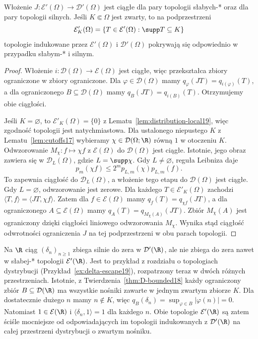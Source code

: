 \begin{twierdzenie}
\label{thm:dt-Eprime-fixed-support}
Włożenie $J:\mathcal E'(\Omega)\to\mathcal D'(\Omega)$
jest ciągłe dla pary topologii słabych-* oraz dla pary
topologii silnych.
Jeśli $K\Subset\Omega$ jest zwarty, to na podprzestrzeni
\[
 \mathcal E'_K(\Omega)=
 \{T\in\mathcal E'(\Omega):\supp T\subseteq K\}
\]
topologie indukowane przez $\mathcal E'(\Omega)$
i $\mathcal D'(\Omega)$ pokrywają się odpowiednio
w przypadku słabym-* i silnym.
\end{twierdzenie}
\begin{proof}
Włożenie $i:\mathcal D(\Omega)\to\mathcal E(\Omega)$
jest ciągłe, więc przekształca zbiory ograniczone
w zbiory ograniczone. Dla $\varphi\in\mathcal D(\Omega)$
mamy $q_\varphi(JT)=q_{i(\varphi)}(T)$, a dla ograniczonego
$B\subseteq\mathcal D(\Omega)$ mamy
$q_B(JT)=q_{i(B)}(T)$. Otrzymujemy obie ciągłości.

Jeśli $K=\varnothing$, to $\mathcal E'_K(\Omega)=\{0\}$
z Lematu~\ref{lem:distribution-local19}, więc zgodność
topologii jest natychmiastowa.
Dla ustalonego niepustego $K$ z Lematu~\ref{lem:cutoffs17}
wybieramy $\chi\in\mathcal D(\Omega;\R)$ równą $1$
w otoczeniu $K$. Odwzorowanie
$M_\chi:f\mapsto\chi f$ z $\mathcal E(\Omega)$
do $\mathcal D(\Omega)$ jest ciągłe. Istotnie, jego
obraz zawiera się w $\mathcal D_L(\Omega)$,
gdzie $L=\supp\chi$. Gdy $L\ne\varnothing$,
reguła Leibniza daje
\[
 p_m(\chi f)\le 2^m p_{L,m}(\chi)p_{L,m}(f).
\]
To zapewnia ciągłość do $\mathcal D_L(\Omega)$,
a włożenie tego etapu do $\mathcal D(\Omega)$
jest ciągłe. Gdy $L=\varnothing$, odwzorowanie jest zerowe.
Dla każdego $T\in\mathcal E'_K(\Omega)$ zachodzi
$\langle T,f\rangle=\langle JT,\chi f\rangle$.
Zatem dla $f\in\mathcal E(\Omega)$ mamy
$q_f(T)=q_{\chi f}(JT)$, a dla ograniczonego
$A\subseteq\mathcal E(\Omega)$ mamy
$q_A(T)=q_{M_\chi(A)}(JT)$.
Zbiór $M_\chi(A)$ jest ograniczony dzięki ciągłości
liniowego odwzorowania $M_\chi$.
Wynika stąd ciągłość odwrotności ograniczenia $J$
na tej podprzestrzeni w obu parach topologii.
\end{proof}

\begin{przyklad}
\label{ex:dt-Eprime-escaping}
Na $\R$ ciąg $(\delta_n)_{n\ge1}$ zbiega silnie do zera
w $\mathcal D'(\R)$, ale nie zbiega do zera nawet
w słabej-* topologii $\mathcal E'(\R)$.
Jest to przykład z rozdziału o topologiach dystrybucji
(Przykład~\ref{ex:delta-escape19}), rozpatrzony teraz
w dwóch różnych przestrzeniach.
Istotnie, z Twierdzenia~\ref{thm:D-bounded18} każdy
ograniczony zbiór $B\subseteq\mathcal D(\R)$ ma wszystkie
nośniki zawarte w jednym zwartym zbiorze $K$.
Dla dostatecznie dużego $n$ mamy $n\notin K$, więc
$q_B(\delta_n)=\sup_{\varphi\in B}|\varphi(n)|=0$.
Natomiast $1\in\mathcal E(\R)$ i
$\langle\delta_n,1\rangle=1$ dla każdego $n$.
Obie topologie $\mathcal E'(\R)$ są zatem ściśle
mocniejsze od odpowiadających im topologii indukowanych
z $\mathcal D'(\R)$ na całej przestrzeni
dystrybucji o zwartym nośniku.
\end{przyklad}

